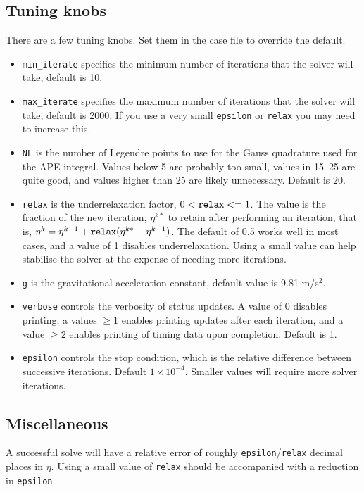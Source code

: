 \documentclass[letterpaper]{article}
\begin{document}
\subsection{Tuning knobs}
There are a few tuning knobs. Set them in the case file to override the default.
\begin{itemize}
 \item \verb+min_iterate+ specifies the minimum number of iterations that the solver will take, default is 10.
 \item \verb+max_iterate+ specifies the maximum number of iterations that the solver will take, default is 2000. If you use a very small \verb+epsilon+ or \verb+relax+ you may need to increase this. 
 \item \verb+NL+ is the number of Legendre points to use for the Gauss quadrature used for the APE integral. Values below 5 are probably too small, values in 15--25 are quite good, and values higher than 25 are likely unnecessary. Default is 20.
 \item \verb+relax+ is the underrelaxation factor, $0 < \verb+relax+ <= 1$.
        The value is the fraction of the new iteration, $\eta^{k*}$ to retain
        after performing an iteration, that is,
        $\eta^k = \eta^{k-1} + \verb+relax+(\eta^{k*} - \eta^{k-1})$.
        The default of 0.5 works well in most cases, and a value of 1 disables underrelaxation.
        Using a small value can help stabilise the solver at the expense of needing more iterations.
 \item \verb+g+ is the gravitational acceleration constant, default value is 9.81 m/s$^2$.
 \item \verb+verbose+ controls the verbosity of status updates. A value of 0 disables printing, a values $\ge 1$ enables printing updates after each iteration, and a value $\ge 2$ enables printing of timing data upon completion. Default is 1.
\item \verb+epsilon+ controls the stop condition, which is the relative difference between successive iterations. Default $1\times10^{-4}$. Smaller values will require more solver iterations.
\end{itemize}

\subsection{Miscellaneous}

A successful solve will have a relative error of roughly \verb+epsilon+/\verb+relax+ decimal places in $\eta$. Using a small value of \verb+relax+ should be accompanied with a reduction in \verb+epsilon+.
\end{document}
